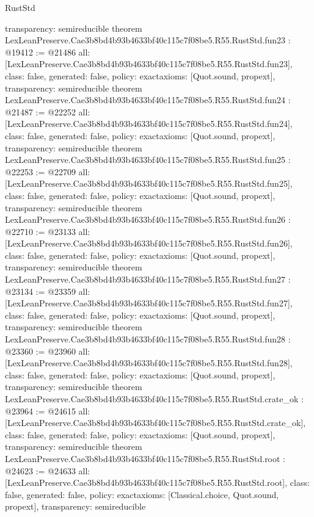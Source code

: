 \begin{lexlean}{RustStd}
\begin{coremodule}
{  transparency: semireducible
}
theorem LexLeanPreserve.Cae3b8bd4b93b4633bf40c115c7f08be5.R55.RustStd.fun23 : @19412 := @21486 {
  all: [LexLeanPreserve.Cae3b8bd4b93b4633bf40c115c7f08be5.R55.RustStd.fun23],
  class: false,
  generated: false,
  policy: exact{axioms: [Quot.sound, propext]},
  transparency: semireducible
}
theorem LexLeanPreserve.Cae3b8bd4b93b4633bf40c115c7f08be5.R55.RustStd.fun24 : @21487 := @22252 {
  all: [LexLeanPreserve.Cae3b8bd4b93b4633bf40c115c7f08be5.R55.RustStd.fun24],
  class: false,
  generated: false,
  policy: exact{axioms: [Quot.sound, propext]},
  transparency: semireducible
}
theorem LexLeanPreserve.Cae3b8bd4b93b4633bf40c115c7f08be5.R55.RustStd.fun25 : @22253 := @22709 {
  all: [LexLeanPreserve.Cae3b8bd4b93b4633bf40c115c7f08be5.R55.RustStd.fun25],
  class: false,
  generated: false,
  policy: exact{axioms: [Quot.sound, propext]},
  transparency: semireducible
}
theorem LexLeanPreserve.Cae3b8bd4b93b4633bf40c115c7f08be5.R55.RustStd.fun26 : @22710 := @23133 {
  all: [LexLeanPreserve.Cae3b8bd4b93b4633bf40c115c7f08be5.R55.RustStd.fun26],
  class: false,
  generated: false,
  policy: exact{axioms: [Quot.sound, propext]},
  transparency: semireducible
}
theorem LexLeanPreserve.Cae3b8bd4b93b4633bf40c115c7f08be5.R55.RustStd.fun27 : @23134 := @23359 {
  all: [LexLeanPreserve.Cae3b8bd4b93b4633bf40c115c7f08be5.R55.RustStd.fun27],
  class: false,
  generated: false,
  policy: exact{axioms: [Quot.sound, propext]},
  transparency: semireducible
}
theorem LexLeanPreserve.Cae3b8bd4b93b4633bf40c115c7f08be5.R55.RustStd.fun28 : @23360 := @23960 {
  all: [LexLeanPreserve.Cae3b8bd4b93b4633bf40c115c7f08be5.R55.RustStd.fun28],
  class: false,
  generated: false,
  policy: exact{axioms: [Quot.sound, propext]},
  transparency: semireducible
}
theorem LexLeanPreserve.Cae3b8bd4b93b4633bf40c115c7f08be5.R55.RustStd.crate_ok : @23964 := @24615 {
  all: [LexLeanPreserve.Cae3b8bd4b93b4633bf40c115c7f08be5.R55.RustStd.crate_ok],
  class: false,
  generated: false,
  policy: exact{axioms: [Quot.sound, propext]},
  transparency: semireducible
}
theorem LexLeanPreserve.Cae3b8bd4b93b4633bf40c115c7f08be5.R55.RustStd.root : @24623 := @24633 {
  all: [LexLeanPreserve.Cae3b8bd4b93b4633bf40c115c7f08be5.R55.RustStd.root],
  class: false,
  generated: false,
  policy: exact{axioms: [Classical.choice, Quot.sound, propext]},
  transparency: semireducible
}


\end{coremodule}
\end{lexlean}
